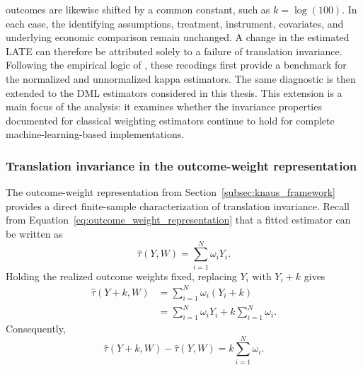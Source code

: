 \documentclass[12pt, a4paper, oneside]{article}
\theoremstyle{plain}
\theoremstyle{definition}
\begin{document}
outcomes are likewise shifted by a common constant, such as \(k=\log(100)\). In each
case, the identifying assumptions, treatment, instrument, covariates, and underlying
economic comparison remain unchanged. A change in the estimated LATE can therefore
be attributed solely to a failure of translation invariance.\\
Following the empirical logic of \citet{sloczynski2025abadie}, these recodings first
provide a benchmark for the normalized and unnormalized kappa estimators. The same
diagnostic is then extended to the DML estimators considered in this thesis. This
extension is a main focus of the analysis: it examines whether the invariance properties
documented for classical weighting estimators continue to hold for complete
machine-learning-based implementations.
\subsubsection{Translation invariance in the outcome-weight representation}
\label{subsubsec:translation_outcome_weights}

The outcome-weight representation from
Section~\ref{subsec:knaus_framework} provides a direct finite-sample
characterization of translation invariance. Recall from
Equation~\eqref{eq:outcome_weight_representation} that a fitted estimator can be
written as
\begin{equation}
    \widehat{\tau}(Y,W)
    =
    \sum_{i=1}^{N}\omega_iY_i.
\end{equation}
Holding the realized outcome weights fixed, replacing \(Y_i\) with \(Y_i+k\)
gives
\begin{align}
    \widehat{\tau}(Y+k,W)
    &=
    \sum_{i=1}^{N}\omega_i(Y_i+k) \\
    &=
    \sum_{i=1}^{N}\omega_iY_i
    +
    k\sum_{i=1}^{N}\omega_i.
\end{align}
Consequently,
\begin{equation}
    \widehat{\tau}(Y+k,W)-\widehat{\tau}(Y,W)
    =
    k\sum_{i=1}^{N}\omega_i.
    \label{eq:translation_weight_identity}
\end{equation}
\end{document}
